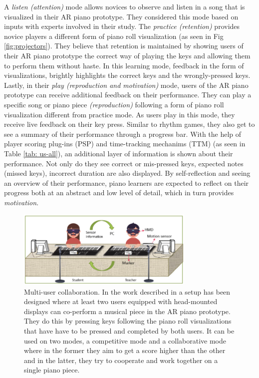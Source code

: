 \documentclass[sigchi, review]{acmart}
\begin{document}
A \textit{listen (attention)} mode allows novices to observe and listen in a song that is visualized in their AR piano prototype. They considered this mode based on inputs with experts involved in their study. The \textit{practice (retention)} provides novice players a different form of piano roll visualization (as seen in Fig \ref{fig:projectors}). They believe that retention is maintained by showing users of their AR piano prototype the correct way of playing the keys and allowing them to perform them without haste. In this learning mode, feedback in the form of visualizations, brightly highlights the correct keys and the wrongly-pressed keys. Lastly, in their \textit{play (reproduction and motivation)} mode, users of the AR piano prototype can receive additional feedback on their performance. They can play a specific song or piano piece \textit{(reproduction)} following a form of piano roll visualization different from practice mode. As users play in this mode, they receive live feedback on their key press. Similar to rhythm games, they also get to see a summary of their performance through a progress bar. With the help of player scoring plug-ins (PSP) and time-tracking mechanims (TTM) (as seen in Table \ref{tab: us-all}), an additional layer of information is shown about their performance. Not only do they see correct or mis-pressed keys, expected notes (missed keys), incorrect duration are also displayed. By self-reflection and seeing an overview of their performance, piano learners are expected to reflect on their progress both at an abstract and low level of detail, which in turn provides \textit{motivation}.

\begin{figure}[t]
    \centering
    \includegraphics[width=8.5cm]{figures/caigroup.png}
    \caption{Multi-user collaboration. In the work described in \cite{cai2019designb} a setup has been designed where at least two users equipped with head-mounted displays can co-perform a musical piece in the AR piano prototype. They do this by pressing keys following the piano roll visualizations that have have to be pressed and completed by both users. It can be used on two modes, a competitive mode and a collaborative mode where in the former they aim to get a score higher than the other and in the latter, they try to cooperate and work together on a single piano piece.}
    \label{fig:caigroup}
\end{figure}
\end{document}
